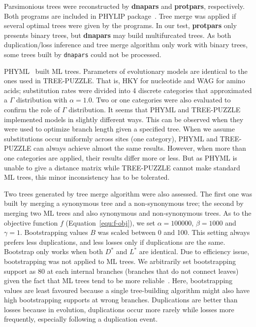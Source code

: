 Parsimonious trees were reconstructed by {\bf dnapars} and {\bf protpars}, respectively.
Both programs are included in PHYLIP package~\cite{felsenstein89}. Tree merge
was applied if several optimal trees were given by the programs.
In our test, {\bf protpars} only presents binary trees, but {\bf dnapars} may build
multifurcated trees. As both duplication/loss inference and tree merge algorithm only work with binary trees,
some trees built by {\tt dnapars} could not be processed.

PHYML~\cite{guindon03} built ML trees. Parameters of evolutionary models are identical
to the ones used in TREE-PUZZLE. That is, HKY for nucleotide and WAG for amino acids;
substitution rates were divided into 4 discrete categories that approximated a $\Gamma$ distribution
with $\alpha=1.0$. Two or one categories were also evaluated to confirm the role
of $\Gamma$ distribution.
It seems that PHYML and TREE-PUZZLE implemented models in slightly different ways.
This can be observed when they were used to optimize branch length
given a specified tree. When we assume substitutions occur uniformly across sites (one category),
PHYML and TREE-PUZZLE can always achieve almost the same results. However,
when more than one categories are applied, their results differ more or less.
But as PHYML is unable to give a distance matrix while TREE-PUZZLE cannot
make standard ML trees, this minor inconsistency has to be tolerated.

Two trees generated by tree merge algorithm were also assessed. The first one was built by merging
a synonymous tree and a non-synonymous tree; the second by merging two ML trees and
also synonymous and non-synonymous trees. As to the objective function $f$ (Equation~\ref{equ:f-obj}),
we set $\alpha=100000$, $\beta=1000$ and $\gamma=1$. Bootstrapping values $B$ was
scaled between 0 and 100. This setting always prefers less duplications, and less losses only if
duplications are the same. Bootstrap only works when both $D^*$ and $L^*$
are identical. Due to efficiency issue, bootstrapping was not applied to
ML trees. We arbitrarily set bootstrapping support as 80 at each internal branches (branches that do not connect leaves)
given the fact that ML trees tend to be more reliable~\cite{kuhner94}.
Here, bootstrapping values are least favoured because a single tree-building algorithm
might also have high bootstrapping supports at wrong branches. Duplications are better
than losses because in evolution, duplications occur more rarely while losses more frequently, especially
following a duplication event.

